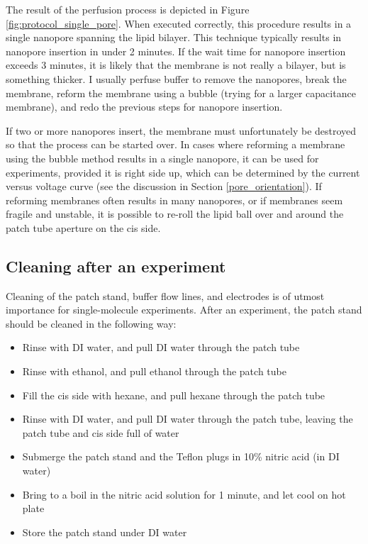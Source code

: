 The result of the perfusion process is depicted in Figure \ref{fig:protocol_single_pore}.  When executed correctly, this procedure results in a single nanopore spanning the lipid bilayer.  This technique typically results in nanopore insertion in under \num{2} minutes.  If the wait time for nanopore insertion exceeds \num{3} minutes, it is likely that the membrane is not really a bilayer, but is something thicker.  I usually perfuse buffer to remove the nanopores, break the membrane, reform the membrane using a bubble (trying for a larger capacitance membrane), and redo the previous steps for nanopore insertion.

If two or more nanopores insert, the membrane must unfortunately be destroyed so that the process can be started over.  In cases where reforming a membrane using the bubble method results in a single nanopore, it can be used for experiments, provided it is right side up, which can be determined by the current versus voltage curve (see the discussion in Section \ref{pore_orientation}).  If reforming membranes often results in many nanopores, or if membranes seem fragile and unstable, it is possible to re-roll the lipid ball over and around the patch tube aperture on the cis side.

\subsection{Cleaning after an experiment}

Cleaning of the patch stand, buffer flow lines, and electrodes is of utmost importance for single-molecule experiments.  After an experiment, the patch stand should be cleaned in the following way:

\begin{itemize}
\item Rinse with DI water, and pull DI water through the patch tube
\item Rinse with ethanol, and pull ethanol through the patch tube
\item Fill the cis side with hexane, and pull hexane through the patch tube
\item Rinse with DI water, and pull DI water through the patch tube, leaving the patch tube and cis side full of water
\item Submerge the patch stand and the Teflon plugs in \num{10}\% nitric acid (in DI water)
\item Bring to a boil in the nitric acid solution for \num{1} minute, and let cool on hot plate
\item Store the patch stand under DI water
\end{itemize}


